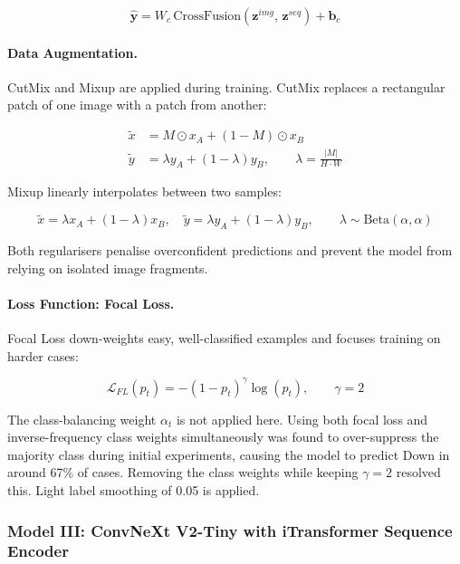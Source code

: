 \begin{equation}
\hat{\mathbf{y}} = W_c \,\text{CrossFusion}(\mathbf{z}^{img},\, \mathbf{z}^{seq}) + \mathbf{b}_c
\label{eq:fusion}
\end{equation}

\paragraph{Data Augmentation.}
CutMix \parencite{yun2019} and Mixup \parencite{zhang2018mixup} are applied during training. CutMix replaces a rectangular patch of one image with a patch from another:

\begin{align}
\tilde{x} &= M \odot x_A + (1 - M) \odot x_B \\
\tilde{y} &= \lambda y_A + (1 - \lambda) y_B, \qquad \lambda = \frac{|M|}{H \cdot W}
\end{align}

Mixup linearly interpolates between two samples:

\begin{equation}
\tilde{x} = \lambda x_A + (1-\lambda)x_B, \quad \tilde{y} = \lambda y_A + (1-\lambda)y_B, \qquad \lambda \sim \mathrm{Beta}(\alpha, \alpha)
\end{equation}

Both regularisers penalise overconfident predictions and prevent the model from relying on isolated image fragments.

\paragraph{Loss Function: Focal Loss.}
Focal Loss \parencite{lin2017} down-weights easy, well-classified examples and focuses training on harder cases:

\begin{equation}
\mathcal{L}_{FL}(p_t) = -(1 - p_t)^\gamma \log(p_t), \qquad \gamma = 2
\label{eq:focal}
\end{equation}

The class-balancing weight $\alpha_t$ is not applied here. Using both focal loss and inverse-frequency class weights simultaneously was found to over-suppress the majority class during initial experiments, causing the model to predict Down in around 67\% of cases. Removing the class weights while keeping $\gamma = 2$ resolved this. Light label smoothing of 0.05 is applied.

\subsubsection{Model III: ConvNeXt V2-Tiny with iTransformer Sequence Encoder}
\label{sec:model3}

